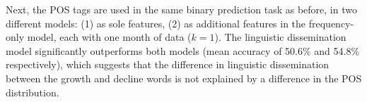 \begin{appendices}
Next, the POS tags are used in the same binary prediction task as before, in two different models: (1) as sole features, (2) as additional features in the frequency-only model, each with one month of data ($k=1$).
The linguistic dissemination model significantly outperforms both models (mean accuracy of 50.6\% and 54.8\% respectively), which suggests that the difference in linguistic dissemination between the growth and decline words is not explained by a difference in the POS distribution.

%

\end{appendices}